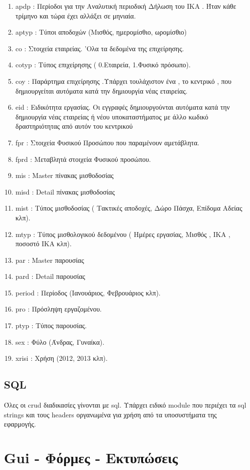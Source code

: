 \documentclass[A4,10pt,greek]{book}
\begin{document}
\begin{enumerate}
\item apdp : Περίοδοι για την Αναλυτική περιοδική Δήλωση του ΙΚΑ . Ήταν κάθε τρίμηνο και τώρα έχει αλλάξει σε μηνιαία.
\item aptyp : Τύποι αποδοχών (Μισθός, ημερομίσθιο, ωρομίσθιο)
\item co : Στοιχεία εταιρείας. 'Ολα τα δεδομένα της επιχείρησης.
\item cotyp : Τύπος επιχείρησης ( 0.Εταιρεία, 1.Φυσικό πρόσωπο).
\item coy : Παράρτημα επιχείρησης .Υπάρχει τουλάχιστον ένα , το κεντρικό , που δημιουργείται αυτόματα κατά την δημιουργία νέας εταιρείας.
\item eid : Ειδικότητα εργασίας. Οι εγγραφές δημιουργούνται αυτόματα κατά την δημιουργία νέας εταιρείας ή νέου υποκαταστήματος με άλλο κωδικό δραστηριότητας από αυτόν του κεντρικού
\item fpr   : Στοιχεία Φυσικού Προσώπου  που παραμένουν αμετάβλητα.
\item fprd : Μεταβλητά στοιχεία Φυσικού προσώπου.
\item mis : Master πίνακας μισθοδοσίας
\item misd : Detail πίνακας μισθοδοσίας
\item mist : Tύπος μισθοδοσίας ( Τακτικές αποδοχές, Δώρο Πάσχα, Επίδομα Αδείας κλπ).
\item mtyp : Τύπος μισθολογικού δεδομένου ( Ημέρες εργασίας, Μισθός , ΙΚΑ , ποσοστό ΙΚΑ κλπ).
\item par : Master παρουσίας
\item pard : Detail παρουσίας
\item period : Περίοδος (Ιανουάριος, Φεβρουάριος κλπ).
\item pro : Πρόσληψη εργαζομένου.
\item ptyp : Τύπος παρουσίας.
\item sex : Φύλο (Άνδρας, Γυναίκα).
\item xrisi : Χρήση (2012, 2013 κλπ). 
\end{enumerate}
\subsection{SQL}
Όλες οι crud διαδικασίες γίνονται με sql. Υπάρχει ειδικό module που περιέχει τα sql strings και τους headers οργανωμένα για χρήση από τα υποσυστήματα της εφαρμογής.
\section{Gui - Φόρμες - Εκτυπώσεις}
\end{document}
